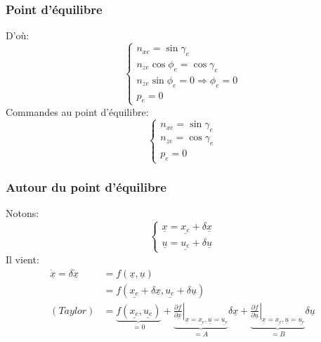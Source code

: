 \documentclass[tikz, footheight=2em]{beamer}
\begin{document}
\begin{frame}
    \frametitle{Point d'équilibre}\pause{}
    D'où:
    \[
    \left \{
    \begin{array}{l}
        n_{xe} = \sin \gamma_e \\
        n_{ze} \cos \phi_e = \cos \gamma_e \\
        n_{ze} \sin \phi_e = 0 \Longrightarrow \phi_e = 0 \\
        p_e = 0
    \end{array}
    \right.
    \]\pause{}
    Commandes au point d'équilibre:
    \[\boxed
    {
        \left \{
        \begin{array}{l}
            n_{xe} = \sin \gamma_e \\
            n_{ze} = \cos \gamma_e \\
            p_e = 0
        \end{array}
        \right.
    }
    \]
\end{frame}

\begin{frame}
    \frametitle{Autour du point d'équilibre}\pause{}
    Notons:
    \[
    \left \{
    \begin{array}{l}
        \underline{x} = \underline{x_e} + \delta \underline{x} \\
        \underline{u} = \underline{u_e} + \delta \underline{u}
    \end{array}
    \right.
    \]\pause{}
    Il vient:
    \begin{align*}
        \underline{\dot{x}} = \delta \underline{\dot{x}} &=
        f(\underline{x}, \underline{u}) \\
            &= f(\underline{x_e} + \delta \underline{x},
                 \underline{u_e} + \delta \underline{u}) \\
            (Taylor) &= \underbrace{f(\underline{x_e}, \underline{u_e})}_{=0} +
                        \underbrace
                        {
                        \left.
                        \frac{\partial f}{\partial \underline{x}}
                        \right| _{\underline{x} = \underline{x_e},
                                 \underline{u} = \underline{u_e}}
                        }_{=A}\delta \underline{x}
                        +
                        \underbrace
                        {
                         \left.
                         \frac{\partial f}{\partial \underline{u}}
                         \right| _{\underline{x} = \underline{x_e},
                                  \underline{u} = \underline{u_e}}
                        }_{=B}\delta \underline{u}
    \end{align*}
\end{frame}
\end{document}
